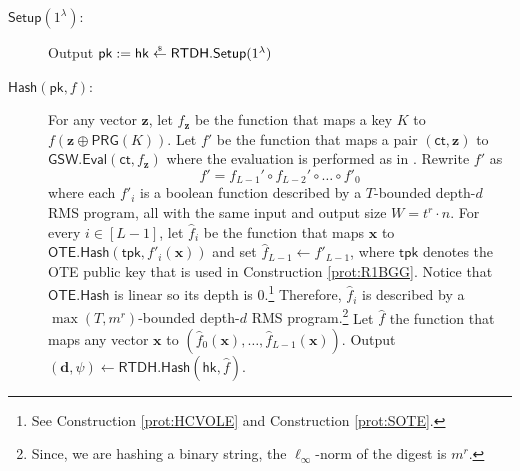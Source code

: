 \documentclass{theoretics}
\newcommand{\getsr}{\overset{\raisebox{-1pt}{$\scriptscriptstyle \$$}}{\gets}}
\newcommand{\sample}{\getsr}
\newcommand{\OTE}{\mathsf{OTE}}
\renewcommand{\sec}{\ensuremath{\lambda}}
\newcommand{\secpar}{\sec}
\newcommand{\ct}{\mathsf{ct}}
\newcommand{\RTDH}{\mathsf{RTDH}}
\newcommand{\BV}{\mathsf{GSW}}
\newcommand{\algofont}[1]{\ensuremath{\mathsf{#1}}}
\newcommand{\tpk}{{\algofont{tpk}}}
\newcommand{\Setup}{{\algofont{Setup}}}
\newcommand{\Eval}{\algofont{Eval}\xspace}
\newcommand{\Hash}{{\algofont{Hash}}}
\newcommand{\pk}{{\mathsf{pk}}}
\newcommand{\hk}{\ensuremath{\mathsf{hk}}}
\newcommand\bbbone{1}
\newenvironment{protocol}[1][]
{\begin{algorithm}\caption{#1}}
  {\end{algorithm}}
\begin{document}
\begin{protocol}[Rate-1 Adaptive LFE for Bounded-Depth Circuits (to be continued)]%
\label{prot:R1LFEforP}


\begin{description}
\item[$\Setup(1^\secpar)$:] Output $\pk:=\hk\sample\RTDH.\Setup(\bbbone^\sec)$


\item[$\Hash(\pk, f)$:] For any vector $\mathbf{z}$, let $f_{\mathbf{z}}$ be the function that maps a key $K$ to $f(\mathbf{z}\oplus \mathsf{PRG}(K))$. Let $f'$ be the function that maps a pair $(\ct, \mathbf{z})$ to $\BV.\Eval(\ct, f_{\mathbf{z}})$ where the evaluation is performed as in \cite{ITCS:BraVai14}. 
Rewrite $f'$ as \[f'=f_{L-1}'\circ f_{L-2}'\circ\dots\circ f'_0\] where each $f'_i$ is a boolean function described by a $T$-bounded depth-$d$ RMS program, all with the same input and output size $W=t^r\cdot n$.
For every $i\in[L-1]$, let $\hat{f}_i$ be the function that maps $\mathbf{x}$ to $\OTE.\Hash(\tpk, f'_i(\mathbf{x}))$ and set $\hat{f}_{L-1}\gets f'_{L-1}$, where $\tpk$ denotes the OTE public key that is used in Construction \ref{prot:R1BGG}. Notice that $\OTE.\Hash$ is linear so its depth is $0$.\footnote{See Construction \ref{prot:HCVOLE} and Construction \ref{prot:SOTE}.} {Therefore, $\hat{f}_i$ is described by a $\max(T, m^{r})$-bounded depth-$d$ RMS program.\footnote{Since, we are hashing a binary string, the $\ell_\infty$-norm of the digest is $m^r$.}} Let $\hat{f}$ the function that maps any vector $\mathbf{x}$ to $(\hat{f}_0(\mathbf{x}), \dots, \hat{f}_{L-1}(\mathbf{x}))$. Output $(\mathbf{d}, \psi)\gets\RTDH.\Hash(\hk, \hat{f})$.




\end{description}
\end{protocol}
\end{document}
